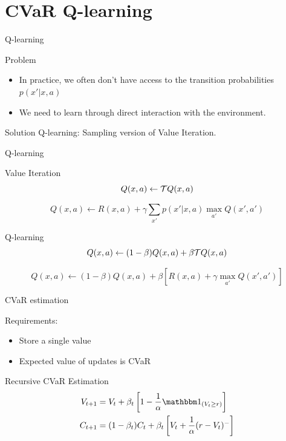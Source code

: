 \documentclass{beamer}
\begin{document}
\section{CVaR Q-learning}

\begin{frame}{Q-learning}


\begin{alertblock}{Problem}
\begin{itemize}
\item In practice, we often don't have access to the transition probabilities $p(x'|x, a)$
\item We need to learn through direct interaction with the environment.
\end{itemize}
\end{alertblock}

\bigskip
\begin{exampleblock}{Solution}
Q-learning: Sampling version of Value Iteration.
\end{exampleblock}
\end{frame}


\begin{frame}{Q-learning}

\begin{block}{Value Iteration}
$$Q(x, a) \leftarrow \mathcal{T} Q(x, a)$$

$$Q(x, a) \leftarrow R(x, a) + \gamma\sum_{x'}  p(x'|x, a) \max_{a'}Q(x', a')$$
\end{block}

\begin{block}{Q-learning}
$$Q(x, a) \leftarrow (1-\beta)Q(x, a) + \beta \mathcal{T} Q(x, a)$$

$$Q(x, a) \leftarrow (1-\beta)Q(x, a) + \beta \left[R(x, a) + \gamma\max_{a'}Q(x', a')\right]$$
\end{block}
\end{frame}


\begin{frame}{CVaR estimation}

Requirements:
\begin{itemize}
\item Store a single value
\item Expected value of updates is CVaR
\end{itemize}

\begin{block}{Recursive CVaR Estimation}
\begin{align*}
V_{t+1} &= V_{t} + \beta_t \bsquare{1-\dfrac{1}{\alpha}\indicator_{(V_t \ge r)}}\\
C_{t+1} &= (1-\beta_t)C_t + \beta_t \bsquare{V_t + \dfrac{1}{\alpha}(r-V_t)^-}
\end{align*}
\end{block}

\end{frame}
\end{document}
